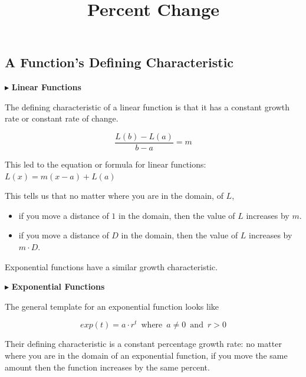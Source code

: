\documentclass{ximera}
\title{Percent Change}
\begin{document}
\begin{abstract}
\end{abstract}
\maketitle




\subsection*{A Function's Defining Characteristic}




$\blacktriangleright$ \textbf{\textcolor{blue!55!black}{Linear Functions}} 

The defining characteristic of a linear function is that it has a constant growth rate or constant rate of change.


\[   \frac{L(b)-L(a)}{b-a} = m       \]

This led to the equation or formula for linear functions:  $L(x) = m(x-a) + L(a)$


This tells us that no matter where you are in the domain, of $L$, 



\begin{itemize}
\item if you move a distance of $1$ in the domain, then the value of $L$ increases by $m$. 
\item if you move a distance of $D$ in the domain, then the value of $L$ increases by $m \cdot D$. 
\end{itemize}

Exponential functions have a similar growth characteristic. 





$\blacktriangleright$ \textbf{\textcolor{blue!55!black}{Exponential Functions}} 



The general template for an exponential function looks like 

\[   exp(t) = a \cdot r^t   \, \text{ where } \,  a \ne 0  \, \text{ and } \,    r > 0   \]



Their defining characteristic is a constant percentage growth rate: no matter where you are in the domain of an exponential function, if you move the same amount then the function increases by the same percent.
\end{document}
